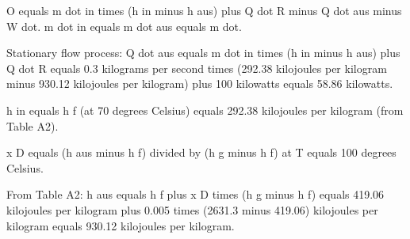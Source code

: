 O equals m dot in times (h in minus h aus) plus Q dot R minus Q dot aus minus W dot.  
m dot in equals m dot aus equals m dot.  

Stationary flow process:  
Q dot aus equals m dot in times (h in minus h aus) plus Q dot R  
equals 0.3 kilograms per second times (292.38 kilojoules per kilogram minus 930.12 kilojoules per kilogram) plus 100 kilowatts  
equals 58.86 kilowatts.  

h in equals h f (at 70 degrees Celsius) equals 292.38 kilojoules per kilogram (from Table A2).  

x D equals (h aus minus h f) divided by (h g minus h f) at T equals 100 degrees Celsius.  

From Table A2:  
h aus equals h f plus x D times (h g minus h f)  
equals 419.06 kilojoules per kilogram plus 0.005 times (2631.3 minus 419.06) kilojoules per kilogram  
equals 930.12 kilojoules per kilogram.